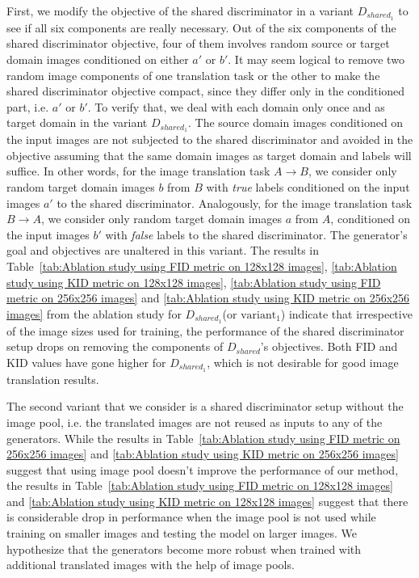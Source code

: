 \documentclass[a4paper,twoside]{article}
\begin{document}
First, we modify the objective of the shared discriminator in a variant $D_{shared_{1}}$ to see if all six components are really necessary. Out of the six components of the shared discriminator objective, four of them involves random source or target domain images conditioned on either $a'$ or $b'$. It may seem logical to remove two random image components of one translation task or the other to make the shared discriminator objective compact, since they differ only in the conditioned part, i.e. $a'$ or $b'$. To verify that, we deal with each domain only once and as target domain in the variant $D_{shared_{1}}$. The source domain images conditioned on the input images are not subjected to the shared discriminator and avoided in the objective assuming that the same domain images as target domain and labels will suffice. In other words, for the image translation task $A \rightarrow B$, we consider only random target domain images $b$ from $B$ with \textit{true} labels conditioned on the input images $a'$ to the shared discriminator. Analogously, for the image translation task $B \rightarrow A$, we consider only random target domain images $a$ from $A$, conditioned on the input images $b'$ with \textit{false} labels to the shared discriminator. The generator's goal and objectives are unaltered in this variant. The results in Table~\ref{tab:Ablation study using FID metric on 128x128 images}, \ref{tab:Ablation study using KID metric on 128x128 images}, \ref{tab:Ablation study using FID metric on 256x256 images} and \ref{tab:Ablation study using KID metric on 256x256 images} from the ablation study for $D_{shared_{1}}$(or \textit{$\text{variant}_1$}) indicate that irrespective of the image sizes used for training, the performance of the shared discriminator setup drops on removing the components of $D_{shared}$'s objectives. Both FID and KID values have gone higher for $D_{shared_{1}}$, which is not desirable for good image translation results.

The second variant that we consider is a shared discriminator setup without the image pool, i.e. the translated images are not reused as inputs to any of the generators. While the results in Table~\ref{tab:Ablation study using FID metric on 256x256 images} and \ref{tab:Ablation study using KID metric on 256x256 images} suggest that using image pool doesn't improve the performance of our method, the results in Table~\ref{tab:Ablation study using FID metric on 128x128 images} and \ref{tab:Ablation study using KID metric on 128x128 images} suggest that there is considerable drop in performance when the image pool is not used while training on smaller images and testing the model on larger images. We hypothesize that the generators become more robust when trained with additional translated images with the help of image pools.
\end{document}
